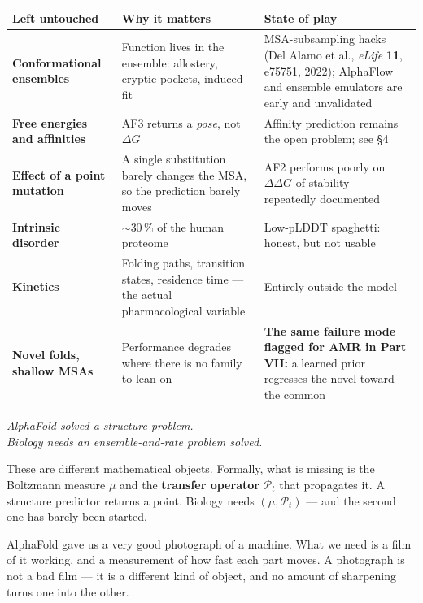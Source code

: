 \begin{center}\small
\begin{tabular}{@{}>{\raggedright\arraybackslash}p{4.2cm}>{\raggedright\arraybackslash}p{5.9cm}>{\raggedright\arraybackslash}p{6.2cm}@{}}
\toprule
\rowcolor{ember!13}
\textbf{\color{ember}Left untouched} & \textbf{\color{ember}Why it matters} & \textbf{\color{ember}State of play}\\
\midrule
\textbf{Conformational ensembles} &
 Function lives in the ensemble: allostery, cryptic pockets, induced fit &
 MSA-subsampling hacks (Del Alamo et al., \textit{eLife} \textbf{11}, e75751, 2022); AlphaFlow and
 ensemble emulators are early and unvalidated\\
\textbf{Free energies and affinities} &
 AF3 returns a \emph{pose}, not $\Delta G$ &
 Affinity prediction remains the open problem; see §4\\
\textbf{Effect of a point mutation} &
 A single substitution barely changes the MSA, so the prediction barely moves &
 AF2 performs poorly on $\Delta\Delta G$ of stability --- repeatedly documented\\
\textbf{Intrinsic disorder} &
 $\sim$30\,\% of the human proteome &
 Low-pLDDT spaghetti: honest, but not usable\\
\rowcolor{ember!7}
\textbf{Kinetics} &
 Folding paths, transition states, residence time --- the actual pharmacological variable &
 Entirely outside the model\\
\textbf{Novel folds, shallow MSAs} &
 Performance degrades where there is no family to lean on &
 \textbf{The same failure mode flagged for AMR in Part VII:} a learned prior regresses the novel
 toward the common\\
\bottomrule
\end{tabular}
\end{center}

\begin{tier3}[title={The one-sentence statement}]
\begin{center}\itshape\large
AlphaFold solved a \emph{structure} problem.\\
Biology needs an \emph{ensemble-and-rate} problem solved.
\end{center}
\vspace{2pt}
These are different mathematical objects. Formally, what is missing is the Boltzmann measure $\mu$
and the \textbf{transfer operator} $\mathcal{P}_t$ that propagates it. A structure predictor returns
a point. Biology needs $(\mu,\mathcal{P}_t)$ --- and the second one has barely been started.
\end{tier3}

\begin{plain}
AlphaFold gave us a very good photograph of a machine. What we need is a film of it working, and a
measurement of how fast each part moves. A photograph is not a bad film --- it is a different kind of
object, and no amount of sharpening turns one into the other.
\end{plain}
